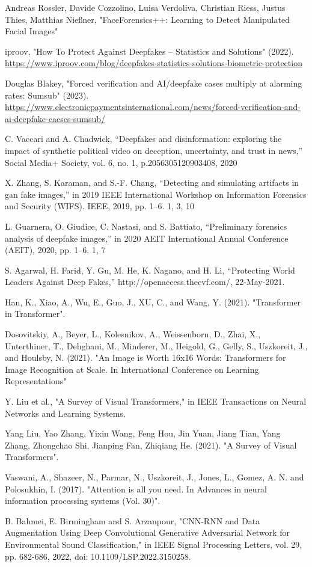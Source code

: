 \begin{thebibliography}{99}

     Andreas Rossler, Davide Cozzolino, Luisa Verdoliva, Christian Riess, Justus Thies, Matthias Nießner, "FaceForensics++: Learning to Detect Manipulated Facial Images"

     iproov, "How To Protect Against Deepfakes – Statistics and Solutions" (2022). \url{https://www.iproov.com/blog/deepfakes-statistics-solutions-biometric-protection}
    
     Douglas Blakey, "Forced verification and AI/deepfake cases multiply at alarming rates: Sumsub" (2023). \url{https://www.electronicpaymentsinternational.com/news/forced-verification-and-ai-deepfake-caeses-sumsub/}

     C. Vaccari and A. Chadwick, “Deepfakes and disinformation: exploring the impact of synthetic political video on deception, uncertainty, and trust in news,” Social Media+ Society, vol. 6, no. 1, p.2056305120903408, 2020
    
     X. Zhang, S. Karaman, and S.-F. Chang, “Detecting and simulating artifacts in gan fake images,” in 2019 IEEE International Workshop on Information Forensics and Security (WIFS). IEEE, 2019, pp. 1–6. 1, 3, 10
    
      L. Guarnera, O. Giudice, C. Nastasi, and S. Battiato, “Preliminary forensics analysis of deepfake images,” in 2020 AEIT International Annual Conference (AEIT), 2020, pp. 1–6. 1, 7

     S. Agarwal, H. Farid, Y. Gu, M. He, K. Nagano, and H. Li, “Protecting World 
    Leaders Against Deep Fakes,” http://openaccess.thecvf.com/,  22-May-2021.
       
     Han, K., Xiao, A., Wu, E., Guo, J., XU, C., and Wang, Y. (2021). "Transformer in Transformer".
    
     Dosovitskiy, A., Beyer, L., Kolesnikov, A., Weissenborn, D., Zhai, X., Unterthiner, T., Dehghani, M., Minderer, M., Heigold, G., Gelly, S., Uszkoreit, J., and Houlsby, N. (2021). "An Image is Worth 16x16 Words: Transformers for Image Recognition at Scale. In International Conference on Learning Representations"

     Y. Liu et al., "A Survey of Visual Transformers," in IEEE Transactions on Neural Networks and Learning Systems.

     Yang Liu, Yao Zhang, Yixin Wang, Feng Hou, Jin Yuan,
    Jiang Tian, Yang Zhang, Zhongchao Shi, Jianping Fan, Zhiqiang He. (2021). "A Survey of Visual Transformers".

     Vaswani, A., Shazeer, N., Parmar, N., Uszkoreit, J., Jones, L., Gomez, A. N. and Polosukhin, I. (2017). "Attention is all you need. In Advances in neural information processing systems (Vol. 30)".

     B. Bahmei, E. Birmingham and S. Arzanpour, "CNN-RNN and Data Augmentation Using Deep Convolutional Generative Adversarial Network for Environmental Sound Classification," in IEEE Signal Processing Letters, vol. 29, pp. 682-686, 2022, doi: 10.1109/LSP.2022.3150258.

\end{thebibliography}

